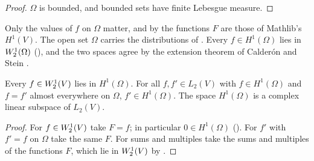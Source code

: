 \begin{proof}
\leanok
$\Omega$ is bounded, and bounded sets have finite Lebesgue measure.
\end{proof}

Only the values of $f$ on $\Omega$ matter, and by  the functions $F$
are those of Mathlib's $H^1(V)$. The open set $\Omega$ carries the distributions of
. Every $f \in H^1(\Omega)$ lies in $W^{1}_{2}(\Omega)$
(), and the two spaces agree by the extension theorem
of Calder\'on and Stein \cite[Chapter VI]{SteinSingular}.

\begin{lemma}
\label{lem:sobolev-lipschitz-domain-basic}
\leanok
{}
Every $f \in W^{1}_{2}(V)$ lies in $H^1(\Omega)$. For all $f, f' \in L_2(V)$ with
$f \in H^1(\Omega)$ and $f = f'$ almost everywhere on $\Omega$, $f' \in H^1(\Omega)$. The space
$H^1(\Omega)$ is a complex linear subspace of $L_2(V)$.
\end{lemma}

\begin{proof}
\leanok
For $f \in W^{1}_{2}(V)$ take $F = f$; in particular $0 \in H^1(\Omega)$
(). For $f'$ with $f' = f$ on $\Omega$ take the same $F$. For
sums and multiples take the sums and multiples of the functions $F$, which lie in
$W^{1}_{2}(V)$ by .
\end{proof}

